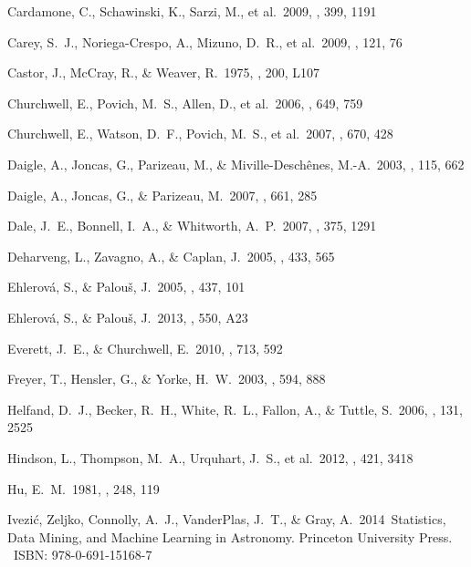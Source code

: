 \documentclass[preprint]{aastex}
\begin{document}
\begin{thebibliography}{16}
 Cardamone, C., 
Schawinski, K., Sarzi, M., et al.\ 2009, \mnras, 399, 1191 

 Carey, S.~J., 
Noriega-Crespo, A., Mizuno, D.~R., et al.\ 2009, \pasp, 121, 76 

 Castor, J., McCray, R., 
\& Weaver, R.\ 1975, \apjl, 200, L107 

 Churchwell, E., 
Povich, M.~S., Allen, D., et al.\ 2006, \apj, 649, 759 

 Churchwell, E., 
Watson, D.~F., Povich, M.~S., et al.\ 2007, \apj, 670, 428 

 Daigle, A., Joncas, G., 
Parizeau, M., \& Miville-Desch{\^e}nes, M.-A.\ 2003, \pasp, 115, 662 

 Daigle, A., Joncas, G., 
\& Parizeau, M.\ 2007, \apj, 661, 285 

 Dale, J.~E., Bonnell, 
I.~A., \& Whitworth, A.~P.\ 2007, \mnras, 375, 1291 

 Deharveng, L., Zavagno, A., \& Caplan, J.\ 2005, \aap, 433, 565 

 Ehlerov{\'a}, S., \& Palou{\v s}, J.\ 2005, \aap, 437, 101 

 Ehlerov{\'a}, S., \& Palou{\v s}, J.\ 2013, \aap, 550, A23 

 Everett, J.~E., \& Churchwell, E.\ 2010, \apj, 713, 592 


 Freyer, T., Hensler, G., 
\& Yorke, H.~W.\ 2003, \apj, 594, 888 

 Helfand, D.~J., Becker, 
R.~H., White, R.~L., Fallon, A., \& Tuttle, S.\ 2006, \aj, 131, 2525 

 Hindson, L., Thompson, 
M.~A., Urquhart, J.~S., et al.\ 2012, \mnras, 421, 3418 

 Hu, E.~M.\ 1981, \apj, 248, 119 

 Ivezi{\'c}, Zeljko, Connolly, A.~J., VanderPlas, J.~T., \& Gray, A.\ 2014\, Statistics, Data Mining, and Machine Learning in Astronomy. Princeton University Press. ~ISBN: 978-0-691-15168-7


\end{thebibliography}
\end{document}
